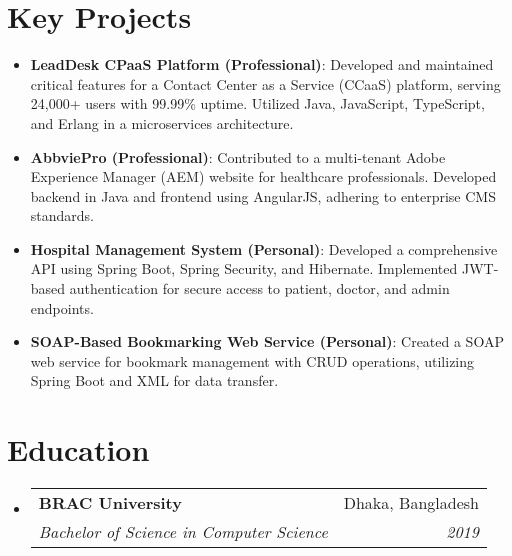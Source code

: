 \documentclass[letterpaper,11pt]{article}
\makeatletter
\newcommand{\resumeItem}[2]{
  \item\small{
    \textbf{#1}{: #2 \vspace{-2pt}}
  }
}
\newcommand{\resumeSubheading}[4]{
  \vspace{-1pt}\item
    \begin{tabular*}{0.97\textwidth}{l@{\extracolsep{\fill}}r}
      \textbf{#1} & #2 \\
      \textit{\small#3} & \textit{\small #4} \\
    \end{tabular*}\vspace{-5pt}
}
\newcommand{\resumeSubItem}[2]{\resumeItem{#1}{#2}\vspace{-4pt}}
\newcommand{\resumeSubHeadingListStart}{\begin{itemize}[leftmargin=*]}
\newcommand{\resumeSubHeadingListEnd}{\end{itemize}}
\makeatother
\begin{document}
\section{Key Projects}
  \resumeSubHeadingListStart
    \resumeSubItem{LeadDesk CPaaS Platform (Professional)}
      {Developed and maintained critical features for a Contact Center as a Service (CCaaS) platform, serving 24,000+ users with 99.99\% uptime. Utilized Java, JavaScript, TypeScript, and Erlang in a microservices architecture.}
    \resumeSubItem{AbbviePro (Professional)}
      {Contributed to a multi-tenant Adobe Experience Manager (AEM) website for healthcare professionals. Developed backend in Java and frontend using AngularJS, adhering to enterprise CMS standards.}
    \resumeSubItem{Hospital Management System (Personal)}
      {Developed a comprehensive API using Spring Boot, Spring Security, and Hibernate. Implemented JWT-based authentication for secure access to patient, doctor, and admin endpoints.}
    \resumeSubItem{SOAP-Based Bookmarking Web Service (Personal)}
      {Created a SOAP web service for bookmark management with CRUD operations, utilizing Spring Boot and XML for data transfer.}
  \resumeSubHeadingListEnd

\section{Education}
  \resumeSubHeadingListStart
    \resumeSubheading
      {BRAC University}{Dhaka, Bangladesh}
      {Bachelor of Science in Computer Science}{2019}
  \resumeSubHeadingListEnd
\end{document}
